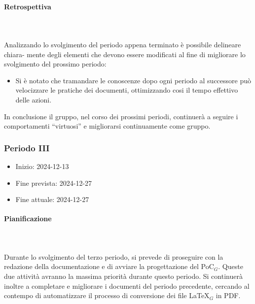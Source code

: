 \paragraph{Retrospettiva} \hspace{1cm} 
\\ \hspace{1cm} \\
Analizzando lo svolgimento del periodo appena terminato è possibile delineare chiara-
mente degli elementi che devono essere modificati al fine di migliorare lo svolgimento del
prossimo periodo:
\begin{itemize}
    \item Si è notato che tramandare le conoscenze dopo ogni periodo al successore può velocizzare le pratiche dei documenti, ottimizzando cosi il tempo effettivo delle azioni.
   
\end{itemize}
In conclusione il gruppo, nel corso dei prossimi periodi, continuerà a seguire i comportamenti ``virtuosi” e migliorarsi continuamente come gruppo.

\subsubsection{Periodo III}

\begin{itemize}
    \item Inizio: 2024-12-13
    \item Fine prevista: 2024-12-27
    \item Fine attuale: 2024-12-27
\end{itemize}
\paragraph{Pianificazione} \hspace{1cm}
\\ \hspace{1cm} \\
Durante lo svolgimento del terzo periodo, si prevede di proseguire con la redazione della documentazione e di avviare la progettazione del PoC$_G$.  
Queste due attività avranno la massima priorità durante questo periodo. Si continuerà inoltre a completare e migliorare i documenti del periodo precedente, cercando al contempo di automatizzare il processo di conversione dei file LaTeX$_G$ in PDF.  

